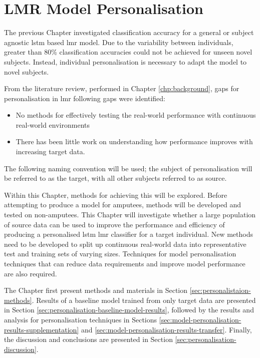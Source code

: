 \chapter{LMR Model Personalisation}
\label{chp:personalisation}
The previous Chapter investigated classification accuracy for a general or subject agnostic \acrshort{lstm} based \acrshort{lmr} model. Due to the variability between individuals, greater than 80\% classification accuracies could not be achieved for unseen novel subjects. Instead, individual personalisation is necessary to adapt the model to novel subjects.

From the literature review, performed in Chapter \ref{chp:background}, gaps for personalisation in \acrshort{lmr} following gaps were identified:
\begin{itemize}
    \item No methods for effectively testing the real-world performance with continuous real-world environments
    \item There has been little work on understanding how performance improves with increasing target data.
\end{itemize}

The following naming convention will be used; the subject of personalisation will be referred to as the target, with all other subjects referred to as source.

Within this Chapter, methods for achieving this will be explored. Before attempting to produce a model for amputees, methods will be developed and tested on non-amputees. This Chapter will investigate whether a large population of source data can be used to improve the performance and efficiency of producing a personalised \acrshort{lstm} \acrshort{lmr} classifier for a target individual. New methods need to be developed to split up continuous real-world data into representative test and training sets of varying sizes. Techniques for model personalisation techniques that can reduce data requirements and improve model performance are also required.

The Chapter first present methods and materials in Section \ref{sec:personalistaion-methods}. Results of a baseline model trained from only target data are presented in Section \ref{sec:personalisation-baseline-model-results}, followed by the results and analysis for personalisation techniques in Sections \ref{sec:model-personalisation-results-supplementation} and \ref{sec:model-personalisation-results-transfer}. Finally, the discussion and conclusions are presented in Section \ref{sec:personalisation-discussion}.

